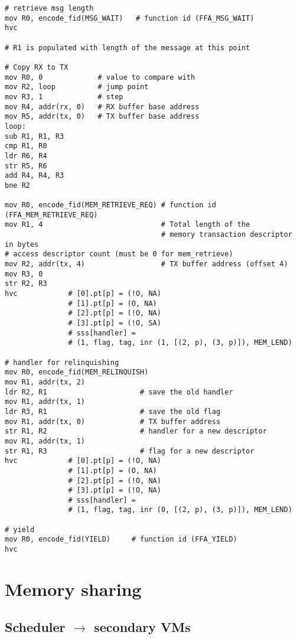 \documentclass{article}
\begin{document}
\begin{lstlisting}[caption={VM 3}]
# retrieve msg length
mov R0, encode_fid(MSG_WAIT)   # function id (FFA_MSG_WAIT)
hvc

# R1 is populated with length of the message at this point

# Copy RX to TX
mov R0, 0             # value to compare with
mov R2, loop          # jump point
mov R3, 1             # step
mov R4, addr(rx, 0)   # RX buffer base address
mov R5, addr(tx, 0)   # TX buffer base address
loop:
sub R1, R1, R3
cmp R1, R0
ldr R6, R4
str R5, R6
add R4, R4, R3
bne R2

mov R0, encode_fid(MEM_RETRIEVE_REQ) # function id (FFA_MEM_RETRIEVE_REQ)
mov R1, 4                            # Total length of the  
                                     # memory transaction descriptor in bytes
# access descriptor count (must be 0 for mem_retrieve)
mov R2, addr(tx, 4)                  # TX buffer address (offset 4)
mov R3, 0
str R2, R3                                    
hvc            # [0].pt[p] = (!O, NA)
               # [1].pt[p] = (O, NA)
               # [2].pt[p] = (!O, NA)
               # [3].pt[p] = (!O, SA)
               # sss[handler] = 
               # (1, flag, tag, inr (1, [(2, p), (3, p)]), MEM_LEND)

# handler for relinquishing
mov R0, encode_fid(MEM_RELINQUISH)
mov R1, addr(tx, 2)
ldr R2, R1                      # save the old handler
mov R1, addr(tx, 1)
ldr R3, R1                      # save the old flag
mov R1, addr(tx, 0)             # TX buffer address
str R1, R2                      # handler for a new descriptor
mov R1, addr(tx, 1)
str R1, R3                      # flag for a new descriptor
hvc            # [0].pt[p] = (!O, NA)
               # [1].pt[p] = (O, NA)
               # [2].pt[p] = (!O, NA)
               # [3].pt[p] = (!O, NA)
               # sss[handler] = 
               # (1, flag, tag, inr (0, [(2, p), (3, p)]), MEM_LEND)

# yield
mov R0, encode_fid(YIELD)     # function id (FFA_YIELD)
hvc
\end{lstlisting}

\section{Memory sharing}

\subsection{Scheduler $\rightarrow$ secondary VMs}
\end{document}
